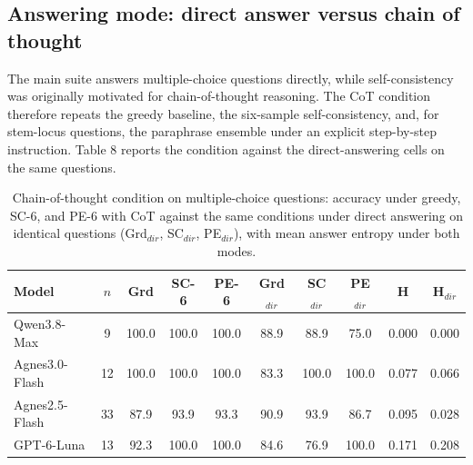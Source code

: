 \documentclass[preprint,12pt]{elsarticle}
\begin{document}
\subsection{Answering mode: direct answer versus chain of thought}


The main suite answers multiple-choice questions directly, while self-consistency was originally motivated for chain-of-thought reasoning. The CoT condition therefore repeats the greedy baseline, the six-sample self-consistency, and, for stem-locus questions, the paraphrase ensemble under an explicit step-by-step instruction. Table 8 reports the condition against the direct-answering cells on the same questions.

\begin{table}[htbp]
\centering
\footnotesize
\caption{Chain-of-thought condition on multiple-choice questions: accuracy under greedy, SC-6, and PE-6 with CoT against the same conditions under direct answering on identical questions (Grd$_{dir}$, SC$_{dir}$, PE$_{dir}$), with mean answer entropy under both modes.}

\scriptsize
\begin{tabular}{l c c c c c c c c c}
\toprule
Model & $n$ & Grd & SC-6 & PE-6 & Grd$_{dir}$ & SC$_{dir}$ & PE$_{dir}$ & H & H$_{dir}$ \\
\midrule
Qwen3.8-Max & 9 & 100.0 & 100.0 & 100.0 & 88.9 & 88.9 & 75.0 & 0.000 & 0.000 \\
Agnes3.0-Flash & 12 & 100.0 & 100.0 & 100.0 & 83.3 & 100.0 & 100.0 & 0.077 & 0.066 \\
Agnes2.5-Flash & 33 & 87.9 & 93.9 & 93.3 & 90.9 & 93.9 & 86.7 & 0.095 & 0.028 \\
GPT-6-Luna & 13 & 92.3 & 100.0 & 100.0 & 84.6 & 76.9 & 100.0 & 0.171 & 0.208 \\
\bottomrule
\end{tabular}
\end{table}
\end{document}
